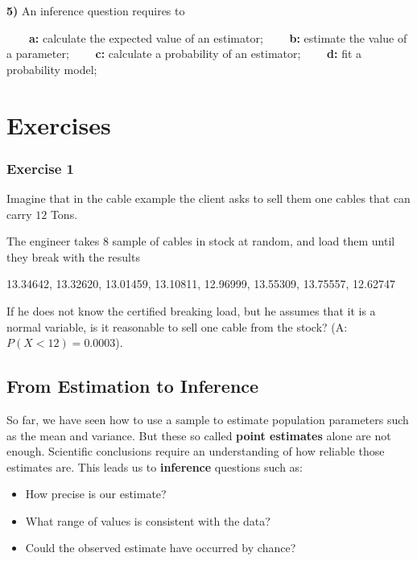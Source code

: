 \documentclass[
]{book}
\providecommand{\tightlist}{%
  \setlength{\itemsep}{0pt}\setlength{\parskip}{0pt}}
\begin{document}
\textbf{5)} An inference question requires to

\textbf{\(\qquad\)a:} calculate the expected value of an estimator;
\textbf{\(\qquad\)b:} estimate the value of a parameter;
\textbf{\(\qquad\)c:} calculate a probability of an estimator;
\textbf{\(\qquad\)d:} fit a probability model;

\hypertarget{exercises-8}{%
\section{Exercises}\label{exercises-8}}

\hypertarget{exercise-1-7}{%
\subsubsection{Exercise 1}\label{exercise-1-7}}

Imagine that in the cable example the client asks to sell them one cables that can carry \(12\) Tons.

The engineer takes \(8\) sample of cables in stock at random, and load them until they break with the results

13.34642, 13.32620, 13.01459, 13.10811, 12.96999, 13.55309, 13.75557, 12.62747

If he does not know the certified breaking load, but he assumes that it is a normal variable, is it reasonable to sell one cable from the stock? (A: \(P(X<12)=0.0003\)).

\hypertarget{from-estimation-to-inference}{%
\subsection{From Estimation to Inference}\label{from-estimation-to-inference}}

So far, we have seen how to use a sample to estimate population parameters such as the mean and variance. But these so called \textbf{point estimates} alone are not enough. Scientific conclusions require an understanding of how reliable those estimates are. This leads us to \textbf{inference} questions such as:

\begin{itemize}
\tightlist
\item
  How precise is our estimate?
\item
  What range of values is consistent with the data?
\item
  Could the observed estimate have occurred by chance?
\end{itemize}
\end{document}
